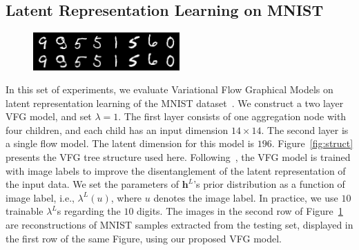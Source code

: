 \documentclass[twoside]{article}
\begin{document}
\subsection{Latent Representation Learning on MNIST}\label{sec:exp:mnist}
\begin{figure}[H]
    \centering
       \includegraphics[width=0.5\textwidth]{fig/reconst_Y.png}
    \label{fig:reconst}
\end{figure}
In this set of experiments, we evaluate  Variational Flow Graphical Models on latent representation learning of the MNIST dataset~\cite{Lecunmnist2010}. 
We construct a two layer VFG model,  and set $\lambda=1$. 
The first layer consists of one aggregation node with four children, and each child has an input dimension $14\times 14$. 
The second layer is a single flow model.
The latent dimension for this model is $196$. Figure~\ref{fig:struct} presents the VFG tree structure used here.
Following~\cite{Sorrenson2020}, the VFG model is trained with image labels to improve the disentanglement of the latent representation of the input data. 
We set the parameters of $\mathbf{h}^L$'s prior distribution as a function of image label, i.e., $\lambda^L(u)$, where $u$ denotes the image label. In practice, we use $10$ trainable $\lambda^L$s regarding the $10$ digits. 
The images in the second row of Figure~\ref{fig:reconst} are reconstructions of MNIST samples extracted from the testing set, displayed in the first row of the same Figure, using our proposed VFG model.  
\end{document}
